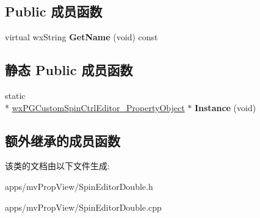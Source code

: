 \subsection*{Public 成员函数}
\begin{DoxyCompactItemize}
\item 
\hypertarget{classwx_p_g_custom_spin_ctrl_editor___property_object_adb0b88e1041f13af30525cb8fae26adf}{virtual wx\+String {\bfseries Get\+Name} (void) const }\label{classwx_p_g_custom_spin_ctrl_editor___property_object_adb0b88e1041f13af30525cb8fae26adf}

\end{DoxyCompactItemize}
\subsection*{静态 Public 成员函数}
\begin{DoxyCompactItemize}
\item 
\hypertarget{classwx_p_g_custom_spin_ctrl_editor___property_object_a624c2a0705cde327a8b0f67721276aa7}{static \\*
\hyperlink{classwx_p_g_custom_spin_ctrl_editor___property_object}{wx\+P\+G\+Custom\+Spin\+Ctrl\+Editor\+\_\+\+Property\+Object} $\ast$ {\bfseries Instance} (void)}\label{classwx_p_g_custom_spin_ctrl_editor___property_object_a624c2a0705cde327a8b0f67721276aa7}

\end{DoxyCompactItemize}
\subsection*{额外继承的成员函数}


该类的文档由以下文件生成\+:\begin{DoxyCompactItemize}
\item 
apps/mv\+Prop\+View/Spin\+Editor\+Double.\+h\item 
apps/mv\+Prop\+View/Spin\+Editor\+Double.\+cpp\end{DoxyCompactItemize}
